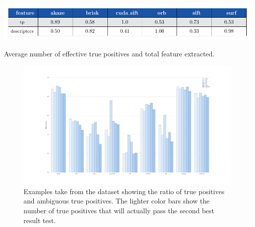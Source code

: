 \begin{table}[h]
\centerline{%
		\includegraphics[width=0.98\linewidth]{tables/descriptivness_ratio.pdf}}
    \vspace{-2mm} 
	\caption{Average number of effective true positives and total feature extracted.}
	\label{table:tp_ratio}
\end{table}


\begin{figure}[t]
\centerline{%
		\includegraphics[width=0.98\linewidth]{imgs/false_positives.pdf}}
    \vspace{-2mm} 
	\caption{Examples take from the dataset showing the ratio of true positives and ambiguous true positives. The lighter color bars show the number of true positives that will actually pass the second best result test.}
	\label{fig:false_positives}
\end{figure}


